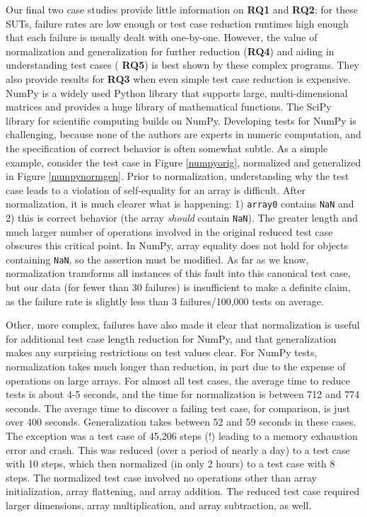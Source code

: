 Our final two case studies provide little information on {\bf RQ1} and
{\bf RQ2}; for these SUTs, failure rates are low enough or test case
reduction runtimes high enough that each failure is usually dealt with
one-by-one.  However, the value of normalization and generalization
for further reduction ({\bf RQ4}) and aiding in understanding test cases ({\bf
  RQ5}) is best shown by these complex programs.  They also provide
results for {\bf RQ3} when even simple test case reduction is expensive.
NumPy \cite{NumPy} is a widely used Python library that
supports large, multi-dimensional matrices and provides a huge library
of mathematical functions.  The SciPy library for scientific
computing builds on NumPy.  Developing tests for NumPy is challenging,
because none of the authors are experts in numeric computation, and
the specification of correct behavior is often somewhat subtle.  As a
simple example, consider the test case in Figure \ref{numpyorig},
normalized and generalized in Figure \ref{numpynormgen}.  Prior to
normalization, understanding why the test case leads to a violation of
self-equality for an array is difficult.  After
normalization, it is much clearer what is happening: 1) {\tt array0}
contains {\tt NaN} and 2) this is correct behavior (the array
\emph{should} contain {\tt NaN}).  The greater length and much larger
number of operations involved in the original reduced test case
obscures this critical point.  In NumPy, array equality does not hold
for objects containing {\tt NaN}, so the assertion must be modified.
As far as we know, normalization transforms all instances of this
fault into this canonical test case, but our data (for fewer than 30
failures) is insufficient to make a definite claim, as the failure rate
is slightly less than 3 failures/100,000 tests on average.

Other, more complex, failures have also made it clear that
normalization is useful for additional test case length reduction for
NumPy, and that generalization makes any surprising restrictions on
test values clear.  For NumPy tests, normalization takes much longer
than reduction, in part due to the expense of operations on large
arrays.  For almost all test cases, the average time to reduce tests
is about 4-5 seconds, and the time for normalization is between 712
and 774 seconds.  The average time to discover a failing test case,
for comparison, is just over 400 seconds.  Generalization takes
between 52 and 59 seconds in these cases.  The exception was a test
case of 45,206 steps (!)  leading to a memory exhaustion error and
crash.  This was reduced (over a period of nearly a day) to a test
case with 10 steps, which then normalized (in only 2 hours) to a test
case with 8 steps.  The normalized test case involved no operations other than array
initialization, array flattening, and array
addition.  The reduced test case required larger dimensions, array
multiplication, and array subtraction, as well.  



